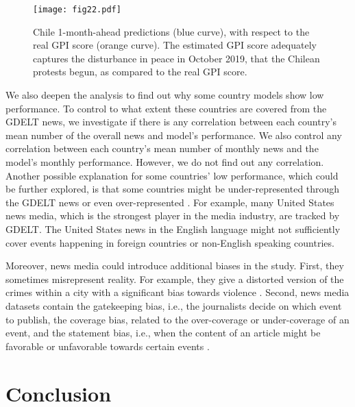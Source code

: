 \documentclass{bmcart}
\begin{document}
\begin{figure}[h!]
\centering
\texttt{[image: fig22.pdf]}
  \caption{ Chile 1-month-ahead predictions (blue curve), with respect to the real GPI score (orange curve). The estimated GPI score adequately captures the disturbance in peace in October 2019, that the Chilean protests begun, as compared to the real GPI score.}
\label{fig:preds_CI}
\end{figure}

We also deepen the analysis to find out why some country models show low performance. 
To control to what extent these countries are covered from the GDELT news, we investigate if there is any correlation between each country's mean number of the overall news and model's performance. We also control any correlation between each country's mean number of monthly news and the model's monthly performance. However, we do not find out any correlation. Another possible explanation for some countries' low performance, which could be further explored, is that some countries might be under-represented through the GDELT news or even over-represented \cite{kwak2014first}. For example, many United States news media, which is the strongest player in the media industry, are tracked by GDELT. The United States news in the English language might not sufficiently cover events happening in foreign countries or non-English speaking countries. 

Moreover, news media could introduce additional biases in the study. First, they sometimes misrepresent reality. For example, they give a distorted version of the crimes within a city with a significant bias towards violence \cite{hollis2017relationship}. Second, news media datasets contain the gatekeeping bias, i.e., the journalists decide on which event to publish, the coverage bias, related to the over-coverage or under-coverage of an event, and the statement bias, i.e., when the content of an article might be favorable or unfavorable towards certain events \cite{dehghanpredicting}.

\section{Conclusion}
\label{discussion}
\begin{comment}
The analysis of peacefulness is taking off with the digital era and machine learning revolution. Standard governmental or survey-based measures of well-being dimensions, such as peacefulness, are now captured with data science models relying on new digital data streams. Hence, compared to traditional well-being research, data science research allows cost-effective and finer analysis across time.
\end{comment}
\end{document}
